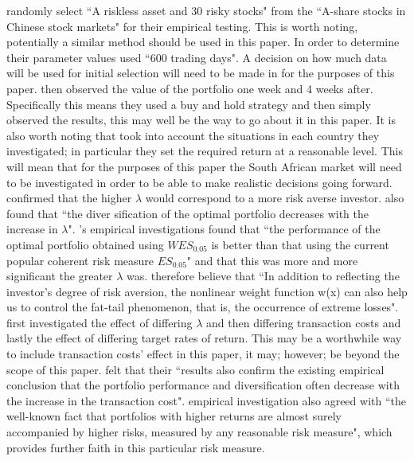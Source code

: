 \documentclass[12pt,a4paper]{article}
\begin{document}
\cite{CHEN20111777} randomly select ``A riskless asset and 30 risky stocks" from the ``A-share stocks in Chinese stock
markets" for their empirical testing. This is worth noting, potentially a similar method should be used in this paper. In order to determine their parameter values \cite{CHEN20111777} used ``600 trading days". A decision on how much data will be used for initial selection will need to be made in for the purposes of this paper. \cite{CHEN20111777} then observed the value of the portfolio one week and 4 weeks after. Specifically this means they used a buy and hold strategy and then simply observed the results, this may well be the way to go about it in this paper. It is also worth noting that \cite{CHEN20111777} took into account the situations in each country they investigated; in particular they set the required return at a reasonable level. This will mean that for the purposes of this paper the South African market will need to be investigated in order to be able to make realistic decisions going forward. \cite{CHEN20111777} confirmed that the higher $\lambda$ would correspond to a more risk averse investor. \cite{CHEN20111777} also found that ``the diver
sification of the optimal portfolio decreases with the increase in  $\lambda$". \cite{CHEN20111777}'s empirical investigations found that ``the performance of the optimal portfolio obtained using $WES_{0.05}$ is better than that using the current popular coherent risk measure $ES_{0.05}$" and that this was more and more significant the greater $\lambda$ was. \cite{CHEN20111777} therefore believe that ``In addition to reflecting the investor’s degree of risk aversion, the nonlinear weight function w(x) can also help us to control the fat-tail phenomenon, that is, the occurrence of extreme losses". \cite{CHEN20111777} first investigated the effect of differing $\lambda$ and then differing transaction costs and lastly the effect of differing target rates of return. This may be a worthwhile way to include transaction costs' effect in this paper, it may; however; be beyond the scope of this paper. \cite{CHEN20111777} felt that their ``results also confirm the existing empirical conclusion that the portfolio performance and diversification often decrease with the increase in the transaction cost". \cite{CHEN20111777} empirical investigation also agreed with ``the well-known fact that portfolios with higher returns
are almost surely accompanied by higher risks, measured by any reasonable risk measure", which provides further faith in this particular risk measure. 
\end{document}
